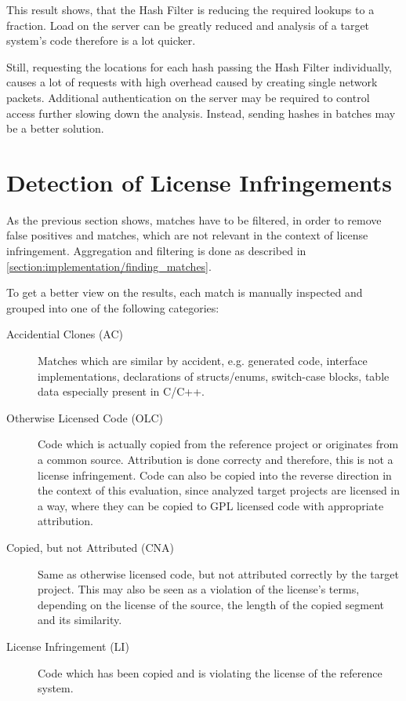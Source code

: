 This result shows, that the Hash Filter is reducing the required lookups to a fraction.
Load on the server can be greatly reduced and analysis of a target system's code therefore is a lot quicker.

Still, requesting the locations for each hash passing the Hash Filter individually, causes a lot of requests with high overhead caused by creating single network packets.
Additional authentication on the server may be required to control access further slowing down the analysis.
Instead, sending hashes in batches may be a better solution.

\section{Detection of License Infringements}
As the previous section shows, matches have to be filtered, in order to remove false positives and matches, which are not relevant in the context of license infringement.
Aggregation and filtering is done as described in \autoref{section:implementation/finding_matches}.

To get a better view on the results, each match is manually inspected and grouped into one of the following categories:
\begin{description}
	\item [Accidential Clones (AC)]
		Matches which are similar by \glqq accident\grqq, e.g. generated code, interface implementations, declarations of structs/enums, switch-case blocks, table data especially present in C/C++.
	\item[Otherwise Licensed Code (OLC)]
		Code which is actually copied from the reference project or originates from a common source.
		Attribution is done correcty and therefore, this is not a license infringement.
		Code can also be copied into the reverse direction in the context of this evaluation, since analyzed target projects are licensed in a way, where they can be copied to GPL licensed code with appropriate attribution.
	\item[Copied, but not Attributed (CNA)] 
		Same as otherwise licensed code, but not attributed correctly by the target project.
		This may also be seen as a violation of the license's terms, depending on the license of the source, the length of the copied segment and its similarity.
	\item[License Infringement (LI)]
		Code which has been copied and is violating the license of the reference system.
\end{description}


